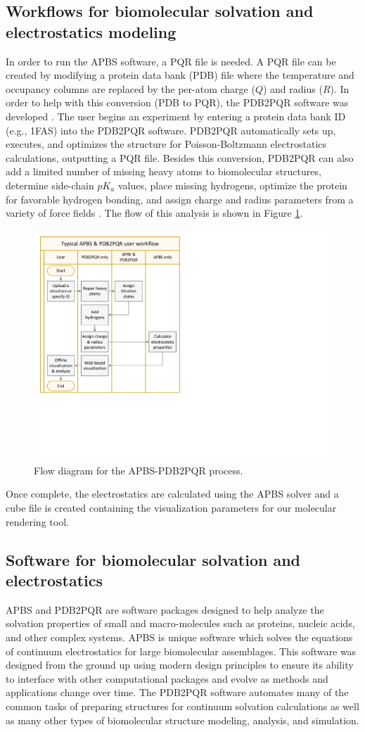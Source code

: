 \documentclass[journal=jpcbfk, manuscript=article]{achemso}
\begin{document}
\subsection{Workflows for biomolecular solvation and electrostatics modeling}
In order to run the APBS software, a PQR file is needed. A PQR file can be created by modifying a protein data bank (PDB) file where the temperature and occupancy columns are replaced by the per-atom charge ($Q$) and radius ($R$). In order to help with this conversion (PDB to PQR), the PDB2PQR software was developed \cite{dolinsky2004}. The user begins an experiment by entering a protein data bank ID (e.g., 1FAS) into the PDB2PQR software. PDB2PQR automatically sets up, executes, and optimizes the structure for Poisson-Boltzmann electrostatics calculations, outputting a PQR file. Besides this conversion, PDB2PQR can also add a limited number of missing heavy atoms to biomolecular structures, determine side-chain $pK_a$ values, place missing hydrogens, optimize the protein for favorable hydrogen bonding, and assign charge and radius parameters from a variety of force fields \cite{dolinsky2004, dolinsky2007}. The flow of this analysis is shown in Figure \ref{fig:PDB2PQR-APBS}.
\begin{figure}
	\centering
	\includegraphics[width=0.60\linewidth]{APBS-and-PDB2PQR-user-flow.pdf} 
	\caption{Flow diagram for the APBS-PDB2PQR process.}
	\label{fig:PDB2PQR-APBS}
\end{figure}
%
Once complete, the electrostatics are calculated using the APBS solver and a cube file is created containing the visualization parameters for our molecular rendering tool. 

\subsection{Software for biomolecular solvation and electrostatics}
APBS and PDB2PQR are software packages designed to help analyze the solvation properties of small and macro-molecules such as proteins, nucleic acids, and other complex systems.  APBS is unique software which solves the equations of continuum electrostatics for large biomolecular assemblages. This software was designed from the ground up using modern design principles to ensure its ability to interface with other computational packages and evolve as methods and applications change over time. The PDB2PQR software automates many of the common tasks of preparing structures for continuum solvation calculations as well as many other types of biomolecular structure modeling, analysis, and simulation.
\end{document}
